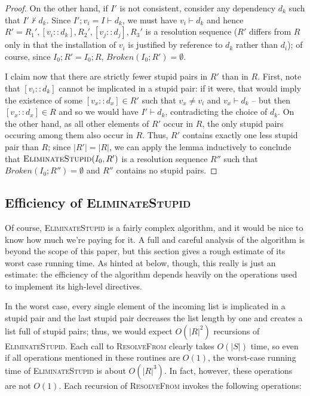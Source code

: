 \documentclass[letterpaper]{article}
\theoremstyle{definition}
\theoremstyle{remark}
\newcommand{\len}[1]{\lvert#1\rvert}
\newcommand{\act}[2]{[#1 :: #2]}
\newcommand{\satisfies}{\vdash}
\begin{document}
\begin{proof}
  On the other hand, if $I'$ is not consistent, consider any
  dependency $d_k$ such that $I' \not \satisfies d_k$.  Since
  $I';v_i=I \satisfies d_k$, we must have $v_i \satisfies d_k$ and
  hence $R'=R_1',\act{v_i}{d_k},R_2',\act{v_j}{d_j},R_3'$ is a
  resolution sequence ($R'$ differs from $R$ only in that the
  installation of $v_i$ is justified by reference to $d_k$ rather than
  $d_i$); of course, since $I_0;R'=I_0;R$, $Broken(I_0;R')=\emptyset$.

  I claim now that there are strictly fewer stupid pairs in $R'$ than
  in $R$.  First, note that $\act{v_i}{d_k}$ cannot be implicated in a
  stupid pair: if it were, that would imply the existence of some
  $\act{v_x}{d_x} \in R'$ such that $v_x \neq v_i$ and $v_x \satisfies
  d_k$ -- but then $\act{v_x}{d_x} \in R$ and so we would have $I'
  \satisfies d_k$, contradicting the choice of $d_k$.  On the other
  hand, as all other elements of $R'$ occur in $R$, the only stupid
  pairs occuring among them also occur in $R$.  Thus, $R'$ contains
  exactly one less stupid pair than $R$; since $\len{R'}=\len{R}$, we
  can apply the lemma inductively to conclude that
  $\Call{EliminateStupid}{I_0,R'}$ is a resolution sequence $R''$ such
  that $Broken(I_0;R'')=\emptyset$ and $R''$ contains no stupid pairs.
\end{proof}

\subsection{Efficiency of \textsc{EliminateStupid}}

Of course, \textsc{EliminateStupid} is a fairly complex algorithm, and
it would be nice to know how much we're paying for it.  A full and
careful analysis of the algorithm is beyond the scope of this paper,
but this section gives a rough estimate of its worst case running
time.  As hinted at below, though, this really is just an estimate:
the efficiency of the algorithm depends heavily on the operations used
to implement its high-level directives.

In the worst case, every single element of the incoming list is
implicated in a stupid pair and the last stupid pair decreases the
list length by one and creates a list full of stupid pairs; thus, we
would expect $O(\len{R}^2)$ recursions of \textsc{EliminateStupid}.
Each call to \textsc{ResolveFrom} clearly takes $O(\len{S})$ time, so
even if all operations mentioned in these routines are $O(1)$, the
worst-case running time of \textsc{EliminateStupid} is about
$O(\len{R}^3)$.  In fact, however, these operations are not $O(1)$.
Each recursion of \textsc{ResolveFrom} invokes the following
operations:
\end{document}
